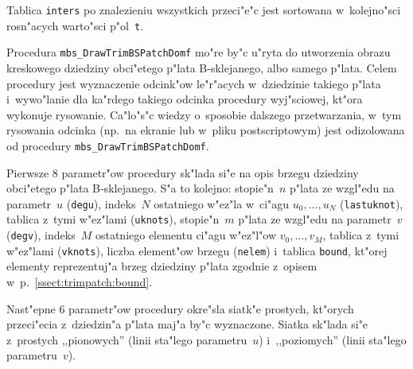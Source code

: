 Tablica \texttt{inters} po znalezieniu wszystkich przeci"e"c jest sortowana
w~kolejno"sci rosn"acych warto"sci p"ol~\texttt{t}.

\vspace{\bigskipamount}
Procedura \texttt{mbs\_DrawTrimBSPatchDomf} mo"re by"c u"ryta do utworzenia
obrazu kreskowego dziedziny obci"etego p"lata B-sklejanego, albo samego
p"lata. Celem procedury jest wyznaczenie odcink"ow le"r"acych w~dziedzinie
takiego p"lata i~wywo"lanie dla ka"rdego takiego odcinka procedury
wyj"sciowej, kt"ora wykonuje rysowanie. Ca"lo"s"c wiedzy o~sposobie dalszego
przetwarzania, w~tym rysowania odcinka (np.\ na ekranie lub w~pliku
postscriptowym) jest odizolowana od procedury
\texttt{mbs\_DrawTrimBSPatchDomf}.

Pierwsze $8$ parametr"ow procedury sk"lada si"e na opis brzegu dziedziny
obci"etego p"lata B-sklejanego. S"a to kolejno: stopie"n~$n$ p"lata ze
wzgl"edu na parametr~$u$ (\texttt{degu}), indeks~$N$ ostatniego w"ez"la
w~ci"agu $u_0,\ldots,u_N$ (\texttt{lastuknot}), tablica z~tymi w"ez"lami
(\texttt{uknots}), stopie"n~$m$ p"lata ze wzgl"edu na parametr~$v$
(\texttt{degv}), indeks~$M$ ostatniego elementu ci"agu w"ez"l"ow
$v_0,\ldots,v_M$, tablica z~tymi w"ez"lami (\texttt{vknots}), liczba
element"ow brzegu (\texttt{nelem}) i~tablica \texttt{bound}, kt"orej
elementy reprezentuj"a brzeg dziedziny p"lata zgodnie z~opisem
w~p.~\ref{ssect:trimpatch:bound}.

Nast"epne $6$ parametr"ow procedury okre"sla siatk"e prostych, kt"orych
przeci"ecia z~dziedzin"a p"lata maj"a by"c wyznaczone. Siatka sk"lada si"e
z~prostych ,,pionowych'' (linii sta"lego parametru~$u$) i~,,poziomych''
(linii sta"lego parametru~$v$).

